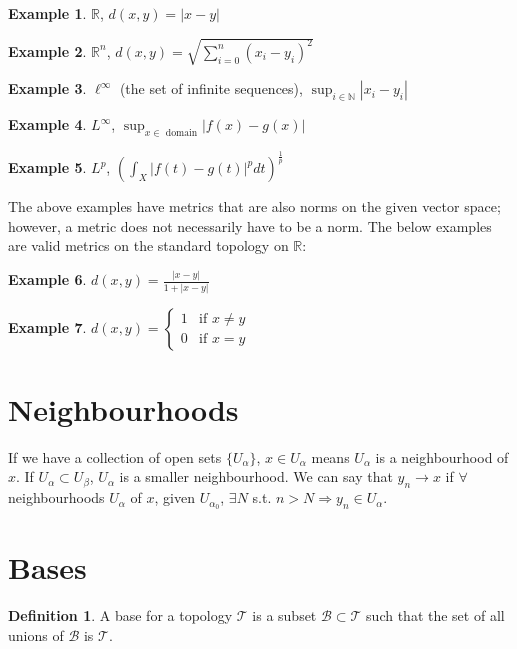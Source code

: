 \documentclass{article}
\theoremstyle{definition}
\newtheorem{definition}{Definition}
\newtheorem{exampled}{Example}[definition]
\begin{document}
\begin{exampled}
	$\mathbb{R}$, $d(x, y)=|x-y|$
\end{exampled}
\begin{exampled}
	$\mathbb{R}^n$, $d(x, y)=\sqrt{\sum_{i=0}^n (x_i-y_i)^2}$
\end{exampled}
\begin{exampled}
	$\ell^\infty$ (the set of infinite sequences), $\sup_{i\in \mathbb{N}}|x_i-y_i|$
\end{exampled}
\begin{exampled}
	$L^\infty$, $\sup_{x\in\text{ domain}} |f(x)-g(x)|$
\end{exampled}
\begin{exampled}
	$L^p$, $(\int_X |f(t)-g(t)|^pdt)^{\frac{1}{p}}$
\end{exampled}
	\noindent
	The above examples have metrics that are also norms on the given vector space; however, a metric does not necessarily have to be a norm. The below examples are valid metrics on the standard topology on $\mathbb{R}$:
\begin{exampled}
	$d(x, y) = \frac{|x-y|}{1 + |x-y|}$
\end{exampled}
\begin{exampled}
	\begin{math}
		d(x, y) =
		\begin{cases}
			1 & \text{if $x \neq y$} \\
			0 & \text{if $x = y$}
		\end{cases}
	\end{math}
\end{exampled}

\section{Neighbourhoods}
If we have a collection of open sets $\{U_\alpha\}$, $x\in U_\alpha$ means $U_\alpha$ is a neighbourhood of $x$. If $U_\alpha \subset U_\beta$, $U_\alpha$ is a smaller neighbourhood. We can say that $y_n \rightarrow x$ if $\forall$ neighbourhoods $U_\alpha$ of $x$, given $U_{\alpha_0}$, $\exists N$ s.t. $n > N \Rightarrow y_n \in U_\alpha$.

\section{Bases}
\begin{definition}
	A base for a topology $\mathcal{T}$ is a subset $\mathcal{B} \subset \mathcal{T}$ such that the set of all unions of $\mathcal{B}$ is $\mathcal{T}$.
\end{definition}
\end{document}

